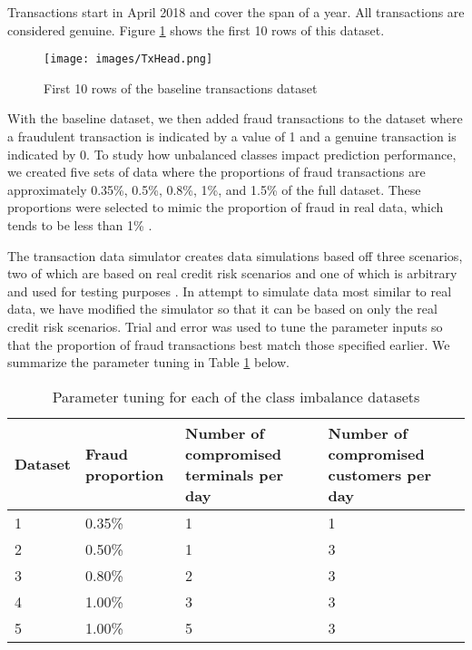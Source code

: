 \documentclass[a4paper, 12pt]{article}
\begin{document}
Transactions start in April 2018 and cover the span of a year. All transactions are considered genuine. Figure \ref{fig:txHead} shows the first 10 rows of this dataset.

\begin{figure}[h]
\begin{center}
\texttt{[image: images/TxHead.png]}
\caption{First 10 rows of the baseline transactions dataset}
\label{fig:txHead}
\end{center}
\end{figure}


With the baseline dataset, we then added fraud transactions to the dataset where a fraudulent transaction is indicated by a value of 1 and a genuine transaction is indicated by 0. To study how unbalanced classes impact prediction performance, we created five sets of data where the proportions of fraud transactions are approximately 0.35\%, 0.5\%, 0.8\%, 1\%, and 1.5\% of the full dataset. These proportions were selected to mimic the proportion of fraud in real data, which tends to be less than 1\% \cite{fraudDetectionHandbook}. 

The transaction data simulator creates data simulations based off three scenarios, two of which are based on real credit risk scenarios and one of which is arbitrary and used for testing purposes \cite{fraudDetectionHandbook}. In attempt to simulate data most similar to real data, we have modified the simulator so that it can be based on only the real credit risk scenarios. Trial and error was used to tune the parameter inputs so that the proportion of fraud transactions best match those specified earlier. We summarize the parameter tuning in Table \ref{tuning} below.

\begin{table}[H]
\centering
\caption{Parameter tuning for each of the class imbalance datasets}
\label{tuning}
    \begin{tabular}{p{1.4cm}|p{2cm}|p{4.3cm}|p{4.5cm}}
	\hline
		  Dataset & Fraud proportion & Number of compromised terminals per day & Number of compromised customers per day \\
		\hline
            1 & 0.35\% & 1 & 1\\
		2 & 0.50\% & 1 & 3\\
            3 & 0.80\% & 2 & 3\\
            4 & 1.00\% & 3 & 3\\
            5 & 1.00\% & 5 & 3\\
		\hline
    \end{tabular}
\end{table}
\end{document}
